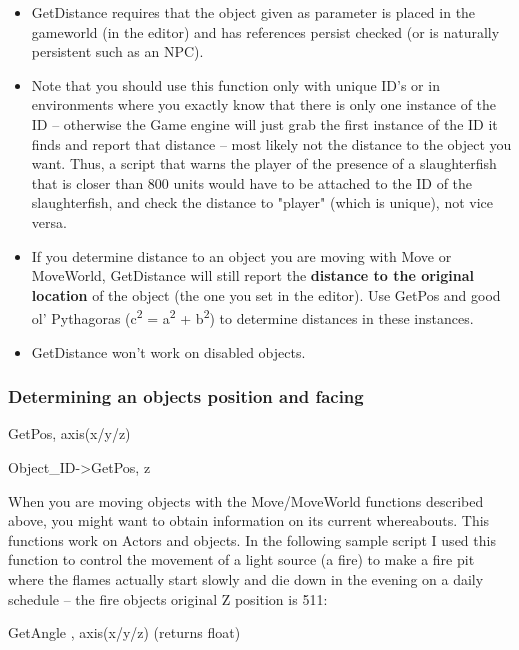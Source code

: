 \documentclass[
]{article}
\begin{document}
\begin{itemize}
\item
  GetDistance requires that the object given as parameter is placed in
  the gameworld (in the editor) and has references persist checked (or
  is naturally persistent such as an NPC).
\item
  Note that you should use this function only with unique ID's or in
  environments where you exactly know that there is only one instance of
  the ID -- otherwise the Game engine will just grab the first instance
  of the ID it finds and report that distance -- most likely not the
  distance to the object you want. Thus, a script that warns the player
  of the presence of a slaughterfish that is closer than 800 units would
  have to be attached to the ID of the slaughterfish, and check the
  distance to "player" (which is unique), not vice versa.
\item
  If you determine distance to an object you are moving with Move or
  MoveWorld, GetDistance will still report the \textbf{distance to the
  original location} of the object (the one you set in the editor). Use
  GetPos and good ol' Pythagoras (c\textsuperscript{2} =
  a\textsuperscript{2} + b\textsuperscript{2}) to determine distances in
  these instances.
\item
  GetDistance won't work on disabled objects.
\end{itemize}

\hypertarget{determining-an-objects-position-and-facing}{%
\subsubsection{Determining an objects position and
facing}\label{determining-an-objects-position-and-facing}}

GetPos, axis(x/y/z)

Object\_ID-\textgreater GetPos, z

When you are moving objects with the Move/MoveWorld functions described
above, you might want to obtain information on its current whereabouts.
This functions work on Actors and objects. In the following sample
script I used this function to control the movement of a light source (a
fire) to make a fire pit where the flames actually start slowly and die
down in the evening on a daily schedule -- the fire objects original Z
position is 511:



GetAngle , axis(x/y/z) (returns float)
\end{document}

